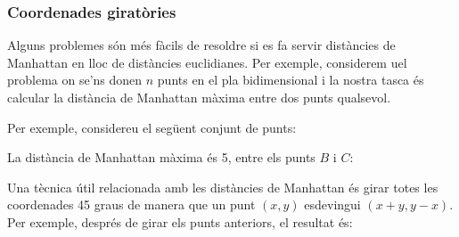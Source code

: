 \subsubsection{Coordenades giratòries}

Alguns problemes són més fàcils de resoldre si es fa servir distàncies
de Manhattan en lloc de distàncies euclidianes. Per exemple,
considerem uel problema on se'ns donen $n$ punts en el pla
bidimensional i la nostra tasca és calcular la distància de
Manhattan màxima entre dos punts qualsevol.

Per exemple, considereu el següent conjunt de punts:
\begin{center}
\end{center}
La distància de Manhattan màxima és 5, entre els punts $B$ i $C$:
\begin{center}
\end{center}


Una tècnica útil relacionada amb les distàncies de Manhattan és girar
totes les coordenades 45 graus de manera que un punt $(x,y)$
esdevingui $(x+y,y-x)$. Per exemple, després de girar els punts
anteriors, el resultat és:



